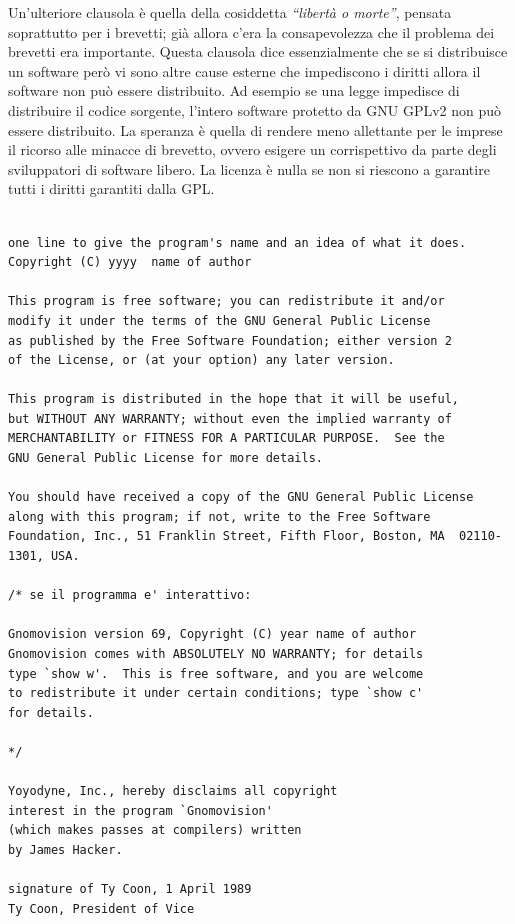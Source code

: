 Un'ulteriore clausola è quella della cosiddetta \textit{``libertà o morte''}, pensata soprattutto per i brevetti; già allora c'era la consapevolezza che il problema dei brevetti era importante. Questa clausola dice essenzialmente che se si distribuisce un software però vi sono altre cause esterne che impediscono i diritti allora il software non può essere distribuito. Ad esempio se una legge impedisce di distribuire il codice sorgente, l'intero software protetto da GNU GPLv2 non può essere distribuito. La speranza è quella di rendere meno allettante per le imprese il ricorso alle minacce di brevetto, ovvero esigere un corrispettivo da parte degli sviluppatori di software libero. La licenza è nulla se non si riescono a garantire tutti i diritti garantiti dalla GPL.

\begin{lstlisting}[caption=Licenza GPLv2]

one line to give the program's name and an idea of what it does.
Copyright (C) yyyy  name of author

This program is free software; you can redistribute it and/or
modify it under the terms of the GNU General Public License
as published by the Free Software Foundation; either version 2
of the License, or (at your option) any later version.

This program is distributed in the hope that it will be useful,
but WITHOUT ANY WARRANTY; without even the implied warranty of
MERCHANTABILITY or FITNESS FOR A PARTICULAR PURPOSE.  See the
GNU General Public License for more details.

You should have received a copy of the GNU General Public License
along with this program; if not, write to the Free Software
Foundation, Inc., 51 Franklin Street, Fifth Floor, Boston, MA  02110-1301, USA.

/* se il programma e' interattivo:

Gnomovision version 69, Copyright (C) year name of author
Gnomovision comes with ABSOLUTELY NO WARRANTY; for details
type `show w'.  This is free software, and you are welcome
to redistribute it under certain conditions; type `show c' 
for details.

*/

Yoyodyne, Inc., hereby disclaims all copyright
interest in the program `Gnomovision'
(which makes passes at compilers) written 
by James Hacker.

signature of Ty Coon, 1 April 1989
Ty Coon, President of Vice

\end{lstlisting}

